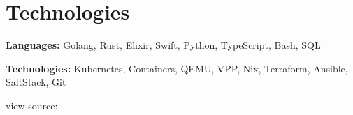 
\section{Technologies}

\begin{onecolentry}
	\textbf{Languages:} Golang, Rust, Elixir, Swift, Python, TypeScript, Bash, SQL
\end{onecolentry}

\vspace{0.2 cm}

\begin{onecolentry}
	\textbf{Technologies:} Kubernetes, Containers, QEMU, VPP, Nix, Terraform, Ansible, SaltStack, Git
\end{onecolentry}


\begin{footer}
    view source: 
\end{footer}


